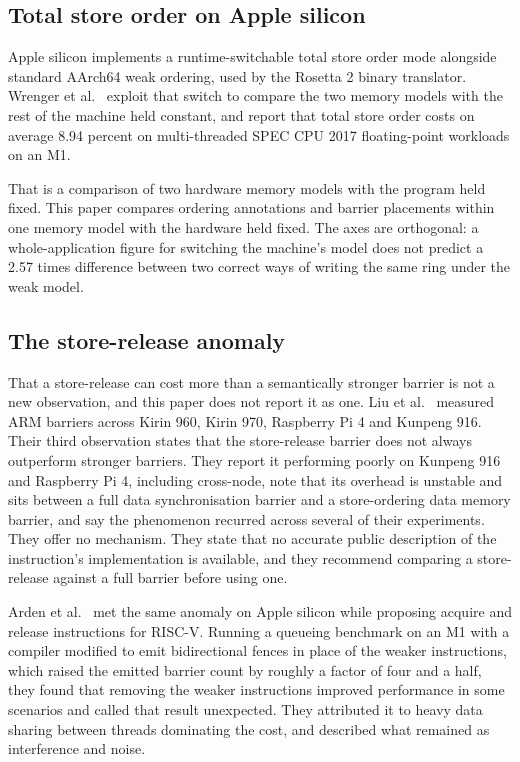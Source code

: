 \documentclass[conference]{IEEEtran}
\begin{document}
\subsection{Total store order on Apple silicon}

Apple silicon implements a runtime-switchable total store order mode alongside
standard AArch64 weak ordering, used by the Rosetta 2 binary translator.
Wrenger et al.~\cite{wrenger2023tosting,wrenger2024m1} exploit that switch to
compare the two memory models with the rest of the machine held constant, and
report that total store order costs on average 8.94 percent on multi-threaded
SPEC CPU 2017 floating-point workloads on an M1.

That is a comparison of two hardware memory models with the program held fixed.
This paper compares ordering annotations and barrier placements within one
memory model with the hardware held fixed. The axes are orthogonal: a
whole-application figure for switching the machine's model does not predict a
2.57 times difference between two correct ways of writing the same ring under
the weak model.

\subsection{The store-release anomaly}

That a store-release can cost more than a semantically stronger barrier is not a
new observation, and this paper does not report it as one. Liu et
al.~\cite{liu2020barriers} measured ARM barriers across Kirin 960, Kirin 970,
Raspberry Pi 4 and Kunpeng 916. Their third observation states that the
store-release barrier does not always outperform stronger barriers. They report
it performing poorly on Kunpeng 916 and Raspberry Pi 4, including cross-node,
note that its overhead is unstable and sits between a full data synchronisation
barrier and a store-ordering data memory barrier, and say the phenomenon
recurred across several of their experiments. They offer no mechanism. They
state that no accurate public description of the instruction's implementation is
available, and they recommend comparing a store-release against a full barrier
before using one.

Arden et al.~\cite{arden2023riscv} met the same anomaly on Apple silicon while
proposing acquire and release instructions for RISC-V. Running a queueing
benchmark on an M1 with a compiler modified to emit bidirectional fences in
place of the weaker instructions, which raised the emitted barrier count by
roughly a factor of four and a half, they found that removing the weaker
instructions improved performance in some scenarios and called that result
unexpected. They attributed it to heavy data sharing between threads dominating
the cost, and described what remained as interference and noise.
\end{document}
